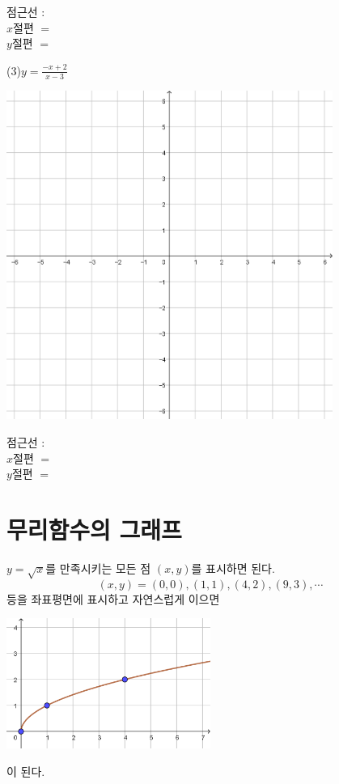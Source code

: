 \documentclass{oblivoir}
\begin{document}
\hspace{0.65\textwidth}\parbox[t]{0.3\textwidth}{점근선 :\\[20pt]\(x\)절편 \(=\)\\[20pt]\(y\)절편 \(=\)}
\newpage
(3)\:\:\(y=\frac{-x+2}{x-3}\)
\begin{center}
\includegraphics[width=0.8\textwidth]{66grid}
\end{center}
\hspace{0.65\textwidth}\parbox[t]{0.3\textwidth}{점근선 :\\[20pt]\(x\)절편 \(=\)\\[20pt]\(y\)절편 \(=\)}

\section{무리함수의 그래프}



%
\label{irrational1}
\(y=\sqrt x\)를 만족시키는 모든 점 \((x,y)\)를 표시하면 된다.
\[(x,y)=(0,0),(1,1),(4,2),(9,3),\cdots\]
등을 좌표평면에 표시하고 자연스럽게 이으면
\begin{center}
\includegraphics[width=0.5\textwidth]{irrational_1}
\end{center}
이 된다.
\end{document}
